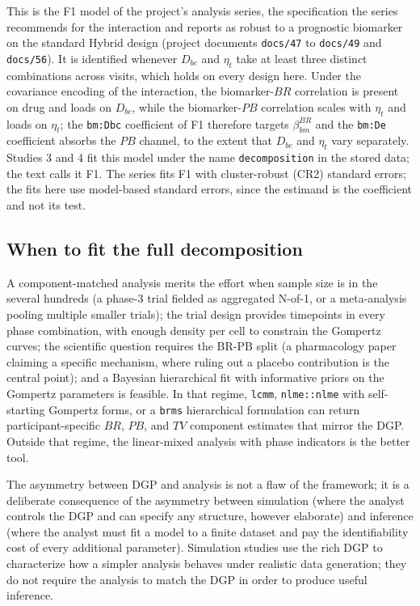 \documentclass[
  11pt,
]{article}
\begin{document}
This is the F1 model of the project's analysis series, the specification
the series recommends for the interaction and reports as robust to a
prognostic biomarker on the standard Hybrid design (project documents
\texttt{docs/47} to \texttt{docs/49} and \texttt{docs/56}). It is
identified whenever \(D_{bc}\) and \(\eta_t\) take at least three distinct
combinations across visits, which holds on every design here. Under the
covariance encoding of the interaction, the biomarker-\(BR\) correlation
is present on drug and loads on \(D_{bc}\), while the biomarker-\(PB\)
correlation scales with \(\eta_t\) and loads on \(\eta_t\); the
\texttt{bm:Dbc} coefficient of F1 therefore targets \(\beta_{bm}^{BR}\) and
the \texttt{bm:De} coefficient absorbs the \(PB\) channel, to the extent
that \(D_{bc}\) and \(\eta_t\) vary separately. Studies 3 and 4 fit this
model under the name \texttt{decomposition} in the stored data; the text
calls it F1. The series fits F1 with cluster-robust (CR2) standard
errors; the fits here use model-based standard errors, since the
estimand is the coefficient and not its test.

\subsection{When to fit the full decomposition}\label{when-to-fit-the-full-decomposition}

A component-matched analysis merits the effort when sample size is in the
several hundreds (a phase-3 trial fielded as aggregated N-of-1, or a
meta-analysis pooling multiple smaller trials); the trial design provides
timepoints in every phase combination, with enough density per cell to
constrain the Gompertz curves; the scientific question requires the BR-PB
split (a pharmacology paper claiming a specific mechanism, where ruling out a
placebo contribution is the central point); and a Bayesian hierarchical fit
with informative priors on the Gompertz parameters is feasible. In that
regime, \texttt{lcmm}, \texttt{nlme::nlme} with self-starting Gompertz forms,
or a \texttt{brms} hierarchical formulation can return participant-specific
\(BR\), \(PB\), and \(TV\) component estimates that mirror the DGP. Outside that
regime, the linear-mixed analysis with phase indicators is the better tool.

The asymmetry between DGP and analysis is not a flaw of the framework; it is a
deliberate consequence of the asymmetry between simulation (where the analyst
controls the DGP and can specify any structure, however elaborate) and
inference (where the analyst must fit a model to a finite dataset and pay the
identifiability cost of every additional parameter). Simulation studies use
the rich DGP to characterize how a simpler analysis behaves under realistic
data generation; they do not require the analysis to match the DGP in order to
produce useful inference.
\end{document}
